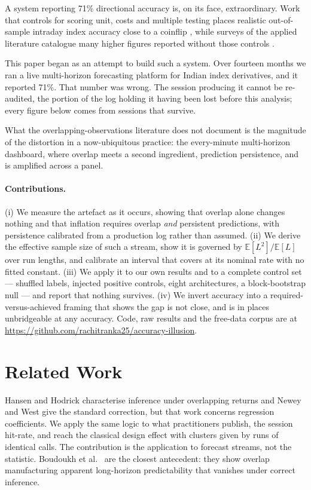 \documentclass[runningheads]{llncs}
\begin{document}
A system reporting 71\% directional accuracy is, on its face, extraordinary.
Work that controls for scoring unit, costs and multiple testing places realistic
out-of-sample intraday index accuracy close to a coinflip
\cite{timmermann2004,sullivan1999}, while surveys of the applied literature
catalogue many higher figures reported without those controls \cite{sezer2020}.

This paper began as an attempt to build such a system. Over fourteen months we
ran a live multi-horizon forecasting platform for Indian index derivatives, and
it reported 71\%. That number was wrong. The session producing it cannot be
re-audited, the portion of the log holding it having been lost before this
analysis; every figure below comes from sessions that survive.

What the overlapping-observations literature does not document is the magnitude
of the distortion in a now-ubiquitous practice: the every-minute multi-horizon
dashboard, where overlap meets a second ingredient, prediction persistence, and
is amplified across a panel.

\paragraph{Contributions.}
(i) We measure the artefact as it occurs, showing that overlap alone changes
nothing and that inflation requires overlap \emph{and} persistent predictions,
with persistence calibrated from a production log rather than assumed. (ii) We
derive the effective sample size of such a stream, show it is governed by
$\mathbb{E}[L^2]/\mathbb{E}[L]$ over run lengths, and calibrate an interval that
covers at its nominal rate with no fitted constant. (iii) We apply it to our own
results and to a complete control set --- shuffled labels, injected positive
controls, eight architectures, a block-bootstrap null --- and report that nothing
survives. (iv) We invert accuracy into a required-versus-achieved framing that
shows the gap is not close, and is in places unbridgeable at any accuracy. Code,
raw results and the free-data corpus are at
\url{https://github.com/rachitranka25/accuracy-illusion}.

\section{Related Work}

Hansen and Hodrick \cite{hansen1980} characterise inference under overlapping
returns and Newey and West \cite{newey1987} give the standard correction, but
that work concerns
regression coefficients. We apply the same logic to what practitioners publish,
the session hit-rate, and reach the classical design effect
\cite{kish1965} with clusters given by runs of identical calls. The
contribution is the application to forecast streams, not the statistic.
Boudoukh et al.\ \cite{boudoukh2008} are the closest antecedent: they show
overlap manufacturing apparent long-horizon predictability that vanishes under
correct inference.
\end{document}
